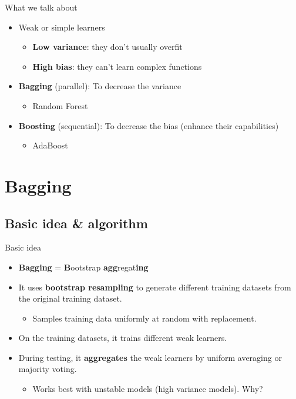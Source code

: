 \documentclass[serif, aspectratio=169]{beamer}
\begin{document}
\begin{frame}{What we talk about}
    \begin{itemize}
        \itemsep1em
        \justifying
        \item Weak or simple learners
        \begin{itemize}
            \itemsep0.25em
            \item \textbf{Low variance}: they don't usually overfit
            \item \textbf{High bias}: they can't learn complex functions
        \end{itemize}
        \item \textbf{Bagging} (parallel): To decrease the variance
        \begin{itemize}
            \item Random Forest
        \end{itemize}
        \item \textbf{Boosting} (sequential): To decrease the bias (enhance their capabilities)
        \begin{itemize}
            \item AdaBoost
        \end{itemize}
    \end{itemize}
\end{frame}

\section{Bagging}

\subsection{Basic idea \& algorithm}

\begin{frame}{Basic idea}
    \begin{itemize}
        \itemsep1em
        \justifying
        \item \textbf{Bagging} = \textbf{B}ootstrap \textbf{agg}regat\textbf{ing}
        \item It uses \textbf{bootstrap resampling} to generate different training datasets from the original training dataset.
        \begin{itemize}
            \item Samples training data uniformly at random with replacement.
        \end{itemize}
        \item On the training datasets, it trains different weak learners.
        \item During testing, it \textbf{aggregates} the weak learners by uniform averaging or majority voting.
        \begin{itemize}
            \item Works best with unstable models (high variance models). Why?
        \end{itemize}
    \end{itemize}
\end{frame}
\end{document}
